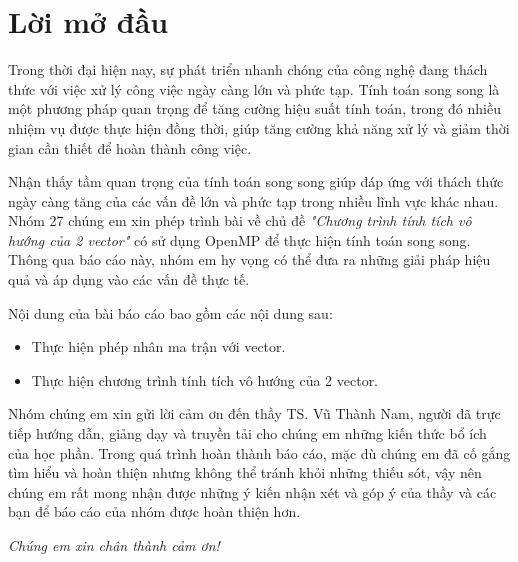 \newpage
\section*{Lời mở đầu}
 {}

Trong thời đại hiện nay, sự phát triển nhanh chóng của công nghệ đang thách thức với việc xử lý công việc ngày càng lớn và phức tạp. Tính toán song song là một phương pháp quan trọng để tăng cường hiệu suất tính toán, trong đó nhiều nhiệm vụ được thực hiện đồng thời, giúp tăng cường khả năng xử lý và giảm thời gian cần thiết để hoàn thành công việc.

Nhận thấy tầm quan trọng của tính toán song song giúp đáp ứng với thách thức ngày càng tăng của các vấn đề lớn và phức tạp trong nhiều lĩnh vực khác nhau. Nhóm 27 chúng em xin phép trình bài về chủ đề \textit{"Chương trình tính tích vô hướng của 2 vector"} có sử dụng OpenMP để thực hiện tính toán song song. Thông qua báo cáo này, nhóm em hy vọng có thể đưa ra những giải pháp hiệu quả và áp dụng vào các vấn đề thực tế.

Nội dung của bài báo cáo bao gồm các nội dung sau:
\begin{itemize}
 \item Thực hiện phép nhân ma trận với vector.
 \item Thực hiện chương trình tính tích vô hướng của 2 vector.
\end{itemize}

Nhóm chúng em xin gửi lời cảm ơn đến thầy TS. Vũ Thành Nam, người đã trực tiếp hướng dẫn, giảng dạy và truyền tải cho chúng em những kiến thức bổ ích của học phần. Trong quá trình hoàn thành báo cáo, mặc dù chúng em đã cố gắng tìm hiểu và hoàn thiện nhưng không thể tránh khỏi những thiếu sót, vậy nên chúng em rất mong nhận được những ý kiến nhận xét và góp ý của thầy và các bạn để báo cáo của nhóm được hoàn thiện hơn.

\vspace{0.5cm}
\textit{Chúng em xin chân thành cảm ơn!}
